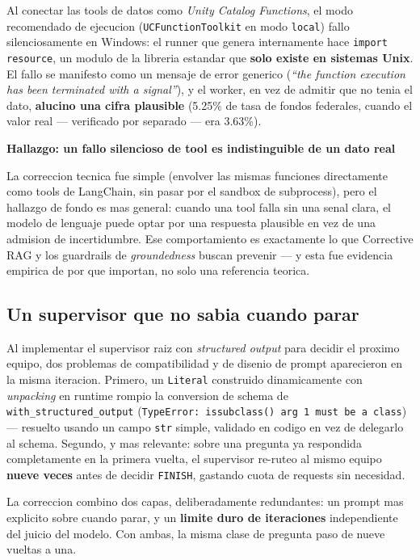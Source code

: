 \documentclass[11pt]{article}
\newenvironment{findingbox}[1]
  {\par\medskip\noindent{\color{warnborder}\rule{\linewidth}{0.7pt}}\par
   \vspace{3pt}\noindent\textbf{\color{warnborder}Hallazgo: #1}\par\smallskip\noindent}
  {\par\vspace{3pt}\noindent{\color{warnborder}\rule{\linewidth}{0.7pt}}\medskip}
\begin{document}
Al conectar las tools de datos como \emph{Unity Catalog Functions}, el modo
recomendado de ejecucion (\texttt{UCFunctionToolkit} en modo \texttt{local})
fallo silenciosamente en Windows: el runner que genera internamente hace
\texttt{import resource}, un modulo de la libreria estandar que \textbf{solo
existe en sistemas Unix}. El fallo se manifesto como un mensaje de error
generico (\emph{``the function execution has been terminated with a
signal''}), y el worker, en vez de admitir que no tenia el dato, \textbf{alucino
una cifra plausible} (5.25\% de tasa de fondos federales, cuando el valor
real --- verificado por separado --- era 3.63\%).

\begin{findingbox}{un fallo silencioso de tool es indistinguible de un dato real}
La correccion tecnica fue simple (envolver las mismas funciones directamente
como tools de LangChain, sin pasar por el sandbox de subprocess), pero el
hallazgo de fondo es mas general: cuando una tool falla sin una senal clara,
el modelo de lenguaje puede optar por una respuesta plausible en vez de una
admision de incertidumbre. Ese comportamiento es exactamente lo que
Corrective RAG y los guardrails de \emph{groundedness} buscan prevenir --- y
esta fue evidencia empirica de por que importan, no solo una referencia
teorica.
\end{findingbox}

\subsection{Un supervisor que no sabia cuando parar}

Al implementar el supervisor raiz con \emph{structured output} para decidir
el proximo equipo, dos problemas de compatibilidad y de disenio de prompt
aparecieron en la misma iteracion. Primero, un \texttt{Literal} construido
dinamicamente con \emph{unpacking} en runtime rompio la conversion de schema
de \texttt{with\_structured\_output} (\texttt{TypeError:\allowbreak\ issubclass()\allowbreak\ arg\ 1\ must\allowbreak\ be\ a\allowbreak\ class}) ---
resuelto usando un campo \texttt{str} simple, validado en codigo en vez de
delegarlo al schema. Segundo, y mas relevante: sobre una pregunta ya
respondida completamente en la primera vuelta, el supervisor re-ruteo al
mismo equipo \textbf{nueve veces} antes de decidir \texttt{FINISH}, gastando
cuota de requests sin necesidad.

La correccion combino dos capas, deliberadamente redundantes: un prompt mas
explicito sobre cuando parar, y un \textbf{limite duro de iteraciones}
independiente del juicio del modelo. Con ambas, la misma clase de pregunta
paso de nueve vueltas a una.
\end{document}
